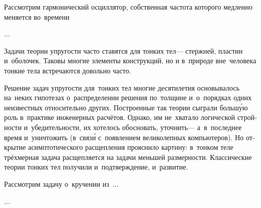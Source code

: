 
\begin{otherlanguage}{russian}

Рассмотрим гармонический осциллятор, собственная частота которого медленно меняется во~времени

...



\end{otherlanguage}



\begin{otherlanguage}{russian}

Задачи теории упругости часто ставятся для тонких тел\:--- стержней, пластин и~оболочек.
Таковы многие элементы конструкций, но и в~природе вне~человека тонкие тела встречаются довольно часто.

Решение задач упругости для~тонких тел многие десятилетия основывалось на~неких гипотезах о~распределении решения по~толщине и~о~порядках одних неизвестных относительно других.
Построенные так теории сыграли больш\'{у}ю роль в~практике инженерных расчётов.
Однако, им не~хватало логической стройности и~убедительности, их хотелось обосновать, уточнить\:--- а~в~последнее время и~уничтожить (в~связ\'{и} с~появлением великолепных компьютеров).
Но открытие асимптотического расщепления прояснило картину: в~тонком теле трёхмерная задача расщепляется на задачи меньшей размерности.
Классические теории тонких тел получили и~подтверждение, и~развитие.

Рассмотрим задачу о~кручении из~...

...




\end{otherlanguage}

\section*{\small \wordforbibliography}

